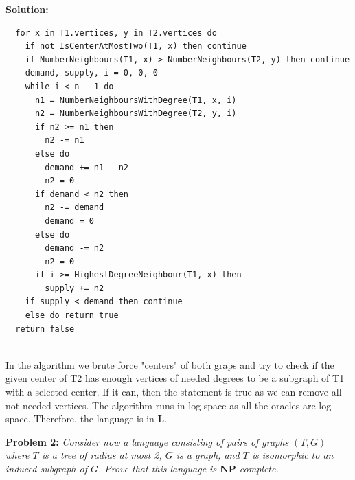\documentclass[12pt]{article}
\newenvironment{problem}[1]{\noindent\textbf{Problem #1:} \itshape}{\par\vspace{10pt}}
\newenvironment{solution}{\noindent\textbf{Solution:} \par\vspace{10pt}}{\par\vspace{10pt}}
\begin{document}
\begin{solution}
\begin{lstlisting}
  for x in T1.vertices, y in T2.vertices do
    if not IsCenterAtMostTwo(T1, x) then continue 
    if NumberNeighbours(T1, x) > NumberNeighbours(T2, y) then continue 
    demand, supply, i = 0, 0, 0
    while i < n - 1 do 
      n1 = NumberNeighboursWithDegree(T1, x, i)
      n2 = NumberNeighboursWithDegree(T2, y, i)
      if n2 >= n1 then 
        n2 -= n1 
      else do 
        demand += n1 - n2
        n2 = 0 
      if demand < n2 then 
        n2 -= demand 
        demand = 0
      else do 
        demand -= n2
        n2 = 0
      if i >= HighestDegreeNeighbour(T1, x) then 
        supply += n2
    if supply < demand then continue 
    else do return true 
  return false


\end{lstlisting}

In the algorithm we brute force "centers" of both graps and try to check if the given center of T2 has enough vertices of needed degrees to be a subgraph of T1 with a selected center. If it can, then the statement is true as we can remove all not needed vertices. The algorithm runs in log space as all the oracles are log space. Therefore, the language is in $\mathbf{L}$.
\end{solution}

\vspace{20pt}

\begin{problem}{2}
Consider now a language consisting of pairs of graphs \( (T, G) \) where \( T \) is a tree of radius at most 2, \( G \) is a graph, and \( T \) is isomorphic to an induced subgraph of \( G \). Prove that this language is \( \mathbf{NP} \)-complete.
\end{problem}
\end{document}
